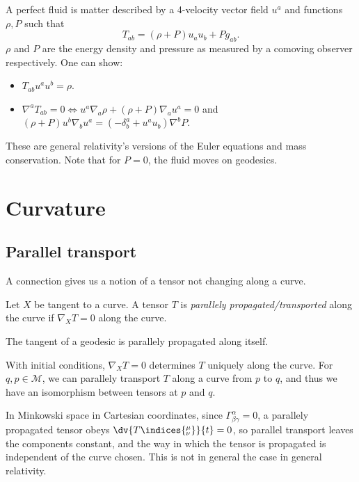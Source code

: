 \documentclass{jknotes}
\begin{document}
\begin{eg}
    A perfect fluid is matter described by a 4-velocity vector field \(u^a\) and functions \(\rho,P\) such that
    \begin{equation}
        T_{ab} = (\rho + P)u_a u_b + P g_{ab}.
    \end{equation}
    \(\rho\) and \(P\) are the energy density and pressure as measured by a comoving observer respectively. One can show:
    \begin{itemize}
        \item \(T_{ab}u^au^b = \rho\).
        \item \(\nabla^a T_{ab} = 0 \iff u^a\nabla_a\rho + (\rho+P)\nabla_a u^a = 0\) and \((\rho+P)u^b\nabla_b u^a = (-\delta^a_b + u^a u_b)\nabla^b P\).
    \end{itemize}
    These are general relativity's versions of the Euler equations and mass conservation. Note that for \(P = 0\), the fluid moves on geodesics.
\end{eg}

\section{Curvature}
\subsection{Parallel transport}
A connection gives us a notion of a tensor not changing along a curve.
\begin{defn}
    Let \(X\) be tangent to a curve. A tensor \(T\) is \emph{parallely propagated/transported} along the curve if \(\nabla_XT = 0\) along the curve. 
\end{defn}

The tangent of a geodesic is parallely propagated along itself.

With initial conditions, \(\nabla_X T = 0\) determines \(T\) uniquely along the curve. For \(q,p\in\mathcal{M}\), we can parallely transport \(T\) along a curve from \(p\) to \(q\), and thus we have an isomorphism between tensors at \(p\) and \(q\).

In Minkowski space in Cartesian coordinates, since \(\Gamma^\alpha_{\beta\gamma} = 0\), a parallely propagated tensor obeys \(\dv{T\indices{^\mu_\nu}}{t} = 0\), so parallel transport leaves the components constant, and the way in which the tensor is propagated is independent of the curve chosen. This is not in general the case in general relativity.
\end{document}
